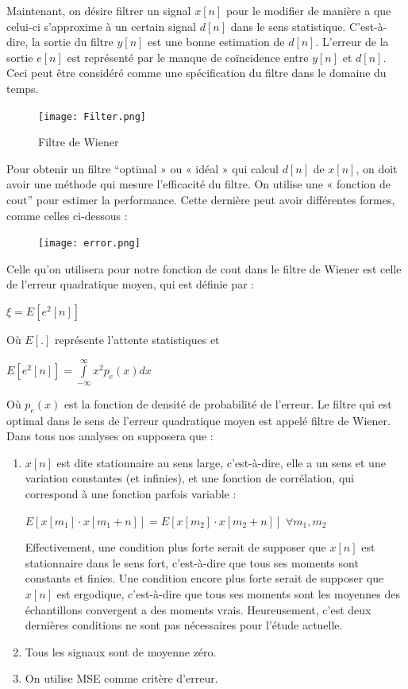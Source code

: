\documentclass[conference,onecolumn]{IEEEtran}
\begin{document}
\medskip
Maintenant, on désire filtrer un signal $x[n]$  pour le modifier de manière a que celui-ci s’approxime à un certain signal $d[n]$ dans le sens statistique. C’est-à-dire, la sortie du filtre $y[n]$ est une bonne estimation de $d[n]$. L’erreur de la sortie $e[n]$ est représenté par le manque de coïncidence entre $y[n]$ et $d[n]$. Ceci peut être considéré comme une spécification du filtre dans le domaine du temps.
\medskip
\begin{figure}[H]
 \centering
    \texttt{[image: Filter.png]}
    \caption{Filtre de Wiener}
\end{figure}
Pour obtenir un filtre “optimal » ou « idéal » qui calcul $d[n]$ de $x[n]$, on doit avoir une méthode qui mesure l’efficacité du filtre. On utilise une « fonction  de cout” pour estimer la performance. Cette dernière peut avoir différentes formes, comme celles ci-dessous :
\medskip
\begin{figure}[H]
 \centering
    \texttt{[image: error.png]}
    \end{figure}
Celle qu’on utilisera pour notre fonction de cout dans le filtre de Wiener est celle de l’erreur quadratique moyen, qui est définie par :
\medskip
\begin{center}
     $ \xi = E[e^2[n]]$
     \medskip
\end{center}
Où $E[.]$ représente l’attente statistiques et 
\medskip
\begin{center}
    $E[e^2[n]]=\int \limits_{-\infty}^{\infty}x^2 p_e(x) dx $
   \medskip
\end{center}
Où $p_e(x)$ est la fonction de densité de probabilité de l’erreur. Le filtre qui est optimal dans le sens de l’erreur quadratique moyen est appelé filtre de Wiener. Dans tous nos analyses on supposera que :
\begin{enumerate}
    \item $x[n]$ est dite stationnaire au sens large, c’est-à-dire, elle a un sens et une variation constantes (et infinies), et une fonction de corrélation, qui correspond à une fonction parfois variable :
    \medskip
    \begin{center}
    $E[x[m_1] \cdot x[m_1+n]]=E[x[m_2] \cdot x[m_2+n]]$  \quad  $\forall m_1,m_2   $
   \medskip
\end{center}
Effectivement, une condition plus forte serait de supposer que $x[n]$ est stationnaire dans le sens fort, c’est-à-dire que tous ses moments sont constants et finies. Une condition encore plus forte serait de supposer que $x[n]$ est ergodique, c’est-à-dire que tous ses moments sont les moyennes des échantillons convergent a des moments vrais. Heureusement, c’est deux dernières conditions ne sont pas nécessaires pour l’étude actuelle. 
    \item Tous les signaux sont de moyenne zéro. \medskip 
    \item On utilise MSE comme critère d’erreur. \medskip 
\end{enumerate}
\end{document}
